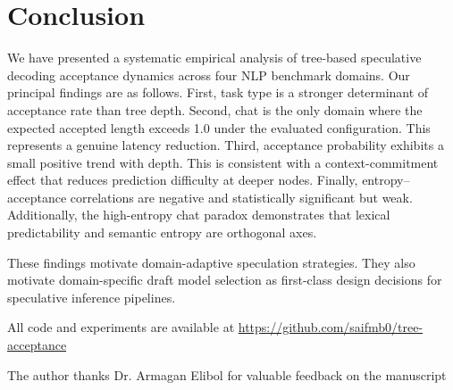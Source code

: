 \documentclass[conference]{IEEEtran}
\begin{document}
\section{Conclusion}

We have presented a systematic empirical analysis of tree-based speculative
decoding acceptance dynamics across four NLP benchmark domains. Our principal findings are as follows. First, task type is a stronger determinant of acceptance rate than tree depth. Second, chat is the only domain where the expected accepted length exceeds 1.0 under the evaluated configuration. This represents a genuine latency reduction. Third, acceptance probability exhibits a small positive trend with depth. This is consistent with a context-commitment effect that reduces prediction difficulty at deeper nodes. Finally, entropy--acceptance correlations are negative and statistically significant but weak. Additionally, the high-entropy chat paradox demonstrates that lexical predictability and semantic entropy are orthogonal axes.

These findings motivate domain-adaptive speculation strategies. They also motivate domain-specific draft model selection as first-class design decisions for speculative inference pipelines.

All code and experiments are available at \url{https://github.com/saifmb0/tree-acceptance} 

The author thanks Dr. Armagan Elibol for valuable feedback on the manuscript



\end{document}
